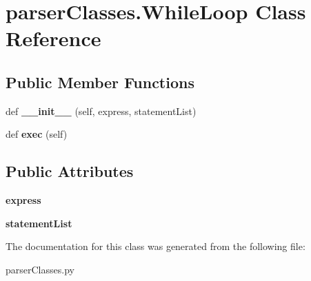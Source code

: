 \hypertarget{classparser_classes_1_1_while_loop}{}\section{parser\+Classes.\+While\+Loop Class Reference}
\label{classparser_classes_1_1_while_loop}
\subsection*{Public Member Functions}
\begin{DoxyCompactItemize}
\item 
def {\bfseries \+\_\+\+\_\+init\+\_\+\+\_\+} (self, express, statement\+List)\hypertarget{classparser_classes_1_1_while_loop_a886ffecb17b87a41ec66691dead4da00}{}\label{classparser_classes_1_1_while_loop_a886ffecb17b87a41ec66691dead4da00}

\item 
def {\bfseries exec} (self)\hypertarget{classparser_classes_1_1_while_loop_a8f1705d74c2e71c1cb37398d33261442}{}\label{classparser_classes_1_1_while_loop_a8f1705d74c2e71c1cb37398d33261442}

\end{DoxyCompactItemize}
\subsection*{Public Attributes}
\begin{DoxyCompactItemize}
\item 
{\bfseries express}\hypertarget{classparser_classes_1_1_while_loop_aadd614a12b85a9536c5cb231eb60a579}{}\label{classparser_classes_1_1_while_loop_aadd614a12b85a9536c5cb231eb60a579}

\item 
{\bfseries statement\+List}\hypertarget{classparser_classes_1_1_while_loop_aef24cd7f0ead40a82bbad44af58890c1}{}\label{classparser_classes_1_1_while_loop_aef24cd7f0ead40a82bbad44af58890c1}

\end{DoxyCompactItemize}


The documentation for this class was generated from the following file\+:\begin{DoxyCompactItemize}
\item 
parser\+Classes.\+py\end{DoxyCompactItemize}
